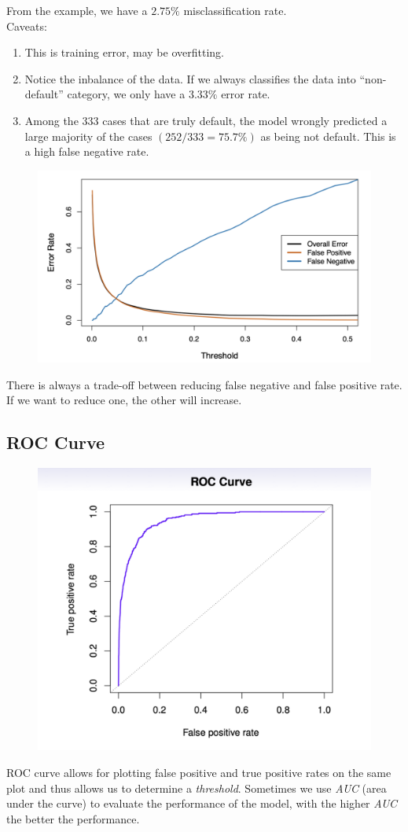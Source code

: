 \documentclass{article}
\begin{document}
From the example, we have a $2.75\%$ misclassification rate.\\

Caveats:
\begin{enumerate}
    \item This is training error, may be overfitting.
    \item Notice the inbalance of the data. If we always classifies the data into ``non-default'' category, we only have a $3.33\%$ error rate.
    \item Among the 333 cases that are truly default, the model wrongly predicted a large majority of the cases $(252/333 = 75.7\%)$ as being not default. This is a high false negative rate.
\end{enumerate}

\begin{figure}[h!]
    \centering
    \includegraphics[width=0.75\linewidth]{FN_FP_tradeoff.png}
    \label{FN_FP_tradeoff}
\end{figure}

There is always a trade-off between reducing false negative and false positive rate. If we want to reduce one, the other will increase.

\newpage

\subsection{ROC Curve}

\begin{figure}[h!]
    \centering
    \includegraphics[width=0.5\linewidth]{ROC.png}
    \label{ROC}
\end{figure}

ROC curve allows for plotting false positive and true positive rates on the same plot and thus allows us to determine a \textit{threshold}. Sometimes we use \textit{AUC} (area under the curve) to evaluate the performance of the model, with the higher \textit{AUC} the better the performance.
\end{document}
